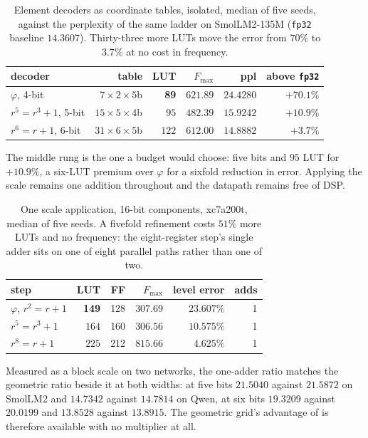 \begin{table}[t]\centering
\caption{Element decoders as coordinate tables, isolated, median of five seeds,
against the perplexity of the same ladder on SmolLM2-135M
(\texttt{fp32} baseline $14.3607$). Thirty-three more LUTs move the error from
$70\%$ to $3.7\%$ at no cost in frequency.}
\label{tab:elemsil}
\begin{tabular}{lrrrrr}
\toprule
decoder & table & LUT & $F_{\max}$ & ppl & above \texttt{fp32} \\
\midrule
$\varphi$, 4-bit          & $7\times2\times5$b  & \textbf{89} & $621.89$ & $24.4280$ & $+70.1\%$ \\
$r^5{=}r^3{+}1$, 5-bit    & $15\times5\times4$b & $95$ & $482.39$ & $15.9242$ & $+10.9\%$ \\
$r^6{=}r{+}1$, 6-bit      & $31\times6\times5$b & $122$ & $612.00$ & $\mathbf{14.8882}$ & $\mathbf{+3.7\%}$ \\
\bottomrule
\end{tabular}
\end{table}

The middle rung is the one a budget would choose: five bits and $95$ LUT for
$+10.9\%$, a six-LUT premium over $\varphi$ for a sixfold reduction in error.
Applying the scale remains one addition throughout and the datapath remains free
of DSP.

\begin{table}[t]\centering
\caption{One scale application, 16-bit components, xc7a200t, median of five
seeds. A fivefold refinement costs $51\%$ more LUTs and no frequency: the
eight-register step's single adder sits on one of eight parallel paths rather
than one of two.}
\label{tab:oneadder}
\begin{tabular}{lrrrrr}
\toprule
step & LUT & FF & $F_{\max}$ & level error & adds \\
\midrule
$\varphi$, $r^2=r+1$   & \textbf{149} & 128 & $307.69$ & $23.607\%$ & 1 \\
$r^5=r^3+1$            & $164$ & 160 & $306.56$ & $10.575\%$ & 1 \\
$r^8=r+1$              & $225$ & 212 & $\mathbf{815.66}$ & $\mathbf{4.625\%}$ & 1 \\
\bottomrule
\end{tabular}
\end{table}

Measured as a block scale on two networks, the one-adder ratio matches the
geometric ratio beside it at both widths: at five bits $21.5040$ against
$21.5872$ on SmolLM2 and $14.7342$ against $14.7814$ on Qwen, at six bits
$19.3209$ against $20.0199$ and $13.8528$ against $13.8915$. The geometric
grid's advantage of  is therefore available with no
multiplier at all.

